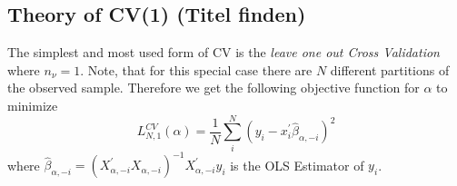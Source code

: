 \documentclass[Research_Module_ES.tex]{subfiles}
\begin{document}
\subsection{Theory of CV(1) (Titel finden)}
The simplest and most used form of CV is the {\itshape leave one out Cross Validation} where $n_\nu=1$. Note, that for this special case there are $N$ different partitions of the observed sample. Therefore we get the following objective function for $\alpha$ to minimize 
\[
	L_{N,1}^{CV}(\alpha)=\frac{1}{N}\sum_{i}^{N}(y_i - x_i^\prime\hat{\beta}_{\alpha,-i})^2
\]
where $\hat{\beta}_{\alpha,-i}=(X_{\alpha,-i}^\prime X_{\alpha,-i})^{-1}X_{\alpha,-i}^\prime y_i$ is the OLS Estimator of $y_i$.
\end{document}
